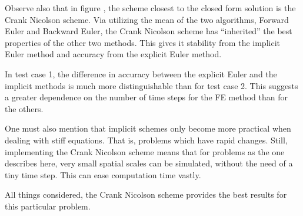 Observe also that in figure , the scheme
closest to the closed form solution is the Crank Nicolson scheme.
Via utilizing the mean of the two algorithms, Forward Euler and
Backward Euler, the Crank Nicolson scheme has ``inherited'' the
best properties of the other two methods. This gives it stability
from the implicit Euler method and accuracy from the explicit Euler
method.

In test case 1, the difference in accuracy between the explicit
Euler and the implicit methods is much more distinguishable than
for test case 2. This suggests a greater dependence on the number
of time steps for the FE method than for the others.

One must also mention that implicit schemes only become more
practical when dealing with stiff equations. That is, problems
which have rapid changes. Still, implementing the Crank Nicolson
scheme means that for problems as the one describes here, very
small spatial scales can be simulated, without the need of a tiny
time step. This can ease computation time vastly.

All things considered, the Crank Nicolson scheme provides the best
results for this particular problem.
